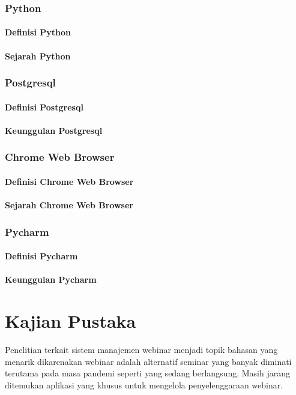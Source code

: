 \subsubsection{Python}
\paragraph{Definisi Python}
\paragraph{Sejarah Python}
\subsubsection{Postgresql}
\paragraph{Definisi Postgresql}
\paragraph{Keunggulan Postgresql}
\subsubsection{Chrome Web Browser}
\paragraph{Definisi Chrome Web Browser}
\paragraph{Sejarah Chrome Web Browser}
\subsubsection{Pycharm}
\paragraph{Definisi Pycharm}
\paragraph{Keunggulan Pycharm}


\section{Kajian Pustaka}
Penelitian terkait sistem manajemen webinar menjadi topik bahasan yang menarik dikarenakan webinar adalah alternatif seminar yang banyak diminati terutama pada masa pandemi seperti yang sedang berlangsung. Masih jarang ditemukan aplikasi yang khusus untuk mengelola penyelenggaraan webinar.


